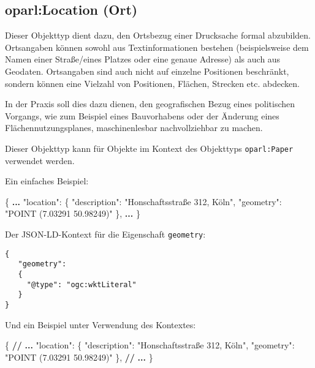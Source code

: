 \documentclass[,a4paper]{article}
\newenvironment{Shaded}{}{}
\newcommand{\DataTypeTok}[1]{\textcolor[rgb]{0.56,0.13,0.00}{{#1}}}
\newcommand{\StringTok}[1]{\textcolor[rgb]{0.25,0.44,0.63}{{#1}}}
\newcommand{\FunctionTok}[1]{\textcolor[rgb]{0.02,0.16,0.49}{{#1}}}
\newcommand{\ErrorTok}[1]{\textcolor[rgb]{1.00,0.00,0.00}{\textbf{{#1}}}}
\begin{document}
\subsection{oparl:Location (Ort)}\label{oparlux5flocation}

Dieser Objekttyp dient dazu, den Ortsbezug einer Drucksache formal
abzubilden. Ortsangaben können sowohl aus Textinformationen bestehen
(beispielsweise dem Namen einer Straße/eines Platzes oder eine genaue
Adresse) als auch aus Geodaten. Ortsangaben sind auch nicht auf einzelne
Positionen beschränkt, sondern können eine Vielzahl von Positionen,
Flächen, Strecken etc. abdecken.

In der Praxis soll dies dazu dienen, den geografischen Bezug eines
politischen Vorgangs, wie zum Beispiel eines Bauvorhabens oder der
Änderung eines Flächennutzungsplanes, maschinenlesbar nachvollziehbar zu
machen.

Dieser Objekttyp kann für Objekte im Kontext des Objekttyps
\texttt{oparl:Paper} verwendet werden.

Ein einfaches Beispiel:

\begin{Shaded}
\begin{Highlighting}[]
\FunctionTok{\{}
    \ErrorTok{...}
    \DataTypeTok{"location"}\FunctionTok{:} \FunctionTok{\{}
        \DataTypeTok{"description"}\FunctionTok{:} \StringTok{"Honschaftsstraße 312, Köln"}\FunctionTok{,}
        \DataTypeTok{"geometry"}\FunctionTok{:} \StringTok{"POINT (7.03291 50.98249)"}
    \FunctionTok{\},}
    \ErrorTok{...}
\FunctionTok{\}}
\end{Highlighting}
\end{Shaded}

Der JSON-LD-Kontext für die Eigenschaft \texttt{geometry}:

\begin{verbatim}
{
   "geometry":
   {
     "@type": "ogc:wktLiteral"
   }
}
\end{verbatim}

Und ein Beispiel unter Verwendung des Kontextes:

\begin{Shaded}
\begin{Highlighting}[]
\FunctionTok{\{}
    \ErrorTok{//} \ErrorTok{...}
    \DataTypeTok{"location"}\FunctionTok{:} \FunctionTok{\{}
        \DataTypeTok{"description"}\FunctionTok{:} \StringTok{"Honschaftsstraße 312, Köln"}\FunctionTok{,}
        \DataTypeTok{"geometry"}\FunctionTok{:} \StringTok{"POINT (7.03291 50.98249)"}
    \FunctionTok{\},}
    \ErrorTok{//} \ErrorTok{...}
\FunctionTok{\}}
\end{Highlighting}
\end{Shaded}
\end{document}
